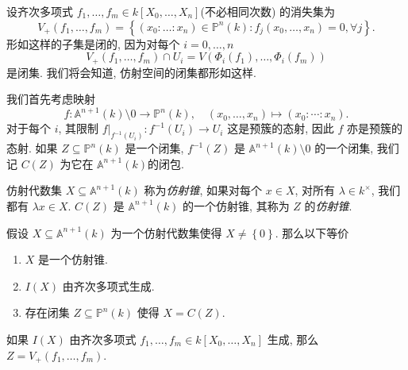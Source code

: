设齐次多项式 \( f_1, \ldots, f_m \in k[X_0, \ldots, X_n] \)(不必相同次数)
的消失集为
\[
  V_{+}(f_1, \ldots, f_m) = \left\lbrace (x_0: \ldots : x_n) \in \mathbb{P}^n(k)
  : f_j(x_0, \ldots, x_n) = 0, \forall j \right\rbrace.
\]
形如这样的子集是闭的, 因为对每个 \( i = 0,\ldots, n \)
\[
  V_{+}(f_1, \ldots, f_m) \cap U_i = V(\Phi_i(f_1), \ldots, \Phi_i(f_m))
\]
是闭集. 我们将会知道, 仿射空间的闭集都形如这样.

我们首先考虑映射
\[
  f: \mathbb{A}^{n + 1}(k) \setminus 0 \to \mathbb{P}^n(k),\quad (x_0, \ldots,
  x_n) \mapsto (x_0 : \cdots : x_n).
\]
对于每个 \( i \), 其限制 \( \left. f \right\vert_{f^{-1}(U_i)}: f^{-1}(U_i) \to
U_i \) 这是预簇的态射, 因此 \( f \) 亦是预簇的态射. 如果 \( Z \subseteq
\mathbb{P}^n(k) \) 是一个闭集, \( f^{-1}(Z) \) 是 \( \mathbb{A}^{n + 1}(k)
\setminus 0 \) 的一个闭集, 我们记 \( C(Z) \) 为它在 \( \mathbb{A}^{n + 1}(k)
\)的闭包.

仿射代数集 \( X \subseteq \mathbb{A}^{n + 1}(k) \) 称为\emph{仿射锥}, 如果对每个
\( x \in X \), 对所有 \( \lambda \in k^{\times} \), 我们都有 \( \lambda x \in X
\). \( C(Z) \) 是 \( \mathbb{A}^{n + 1}(k) \) 的一个仿射锥, 其称为 \( Z \)
的\emph{仿射锥}.

\begin{proposition}
  假设 \( X \subseteq \mathbb{A}^{n + 1}(k) \) 为一个仿射代数集使得 \( X \neq
  \left\lbrace 0 \right\rbrace \). 那么以下等价
  \begin{enumerate}
    \item \( X \) 是一个仿射锥.
    \item \( I(X) \) 由齐次多项式生成.
    \item 存在闭集 \( Z \subseteq \mathbb{P}^n(k) \) 使得 \( X = C(Z) \).
  \end{enumerate}
  如果 \( I(X) \) 由齐次多项式 \( f_1, \ldots, f_m \in k[X_0, \ldots, X_n] \)
  生成, 那么 \( Z = V_{+}(f_1, \ldots, f_m) \).
\end{proposition}
